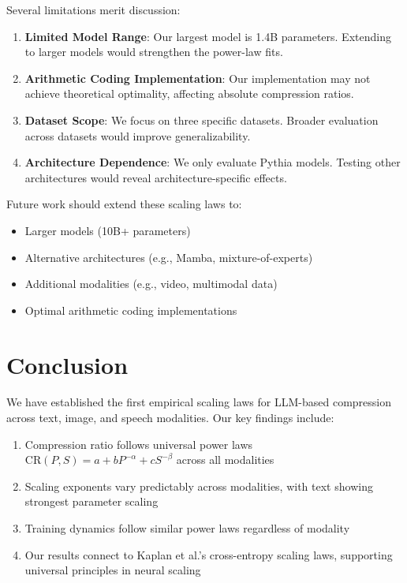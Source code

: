 \documentclass[11pt]{article}
\begin{document}
Several limitations merit discussion:

\begin{enumerate}
\item \textbf{Limited Model Range}: Our largest model is 1.4B parameters. Extending to larger models would strengthen the power-law fits.
\item \textbf{Arithmetic Coding Implementation}: Our implementation may not achieve theoretical optimality, affecting absolute compression ratios.
\item \textbf{Dataset Scope}: We focus on three specific datasets. Broader evaluation across datasets would improve generalizability.
\item \textbf{Architecture Dependence}: We only evaluate Pythia models. Testing other architectures would reveal architecture-specific effects.
\end{enumerate}

Future work should extend these scaling laws to:
\begin{itemize}
\item Larger models (10B+ parameters)
\item Alternative architectures (e.g., Mamba, mixture-of-experts)
\item Additional modalities (e.g., video, multimodal data)
\item Optimal arithmetic coding implementations
\end{itemize}

\section{Conclusion}

We have established the first empirical scaling laws for LLM-based compression across text, image, and speech modalities. Our key findings include:

\begin{enumerate}
\item Compression ratio follows universal power laws $\mathrm{CR}(P,S) = a + bP^{-\alpha} + cS^{-\beta}$ across all modalities
\item Scaling exponents vary predictably across modalities, with text showing strongest parameter scaling
\item Training dynamics follow similar power laws regardless of modality
\item Our results connect to Kaplan et al.'s cross-entropy scaling laws, supporting universal principles in neural scaling
\end{enumerate}
\end{document}
